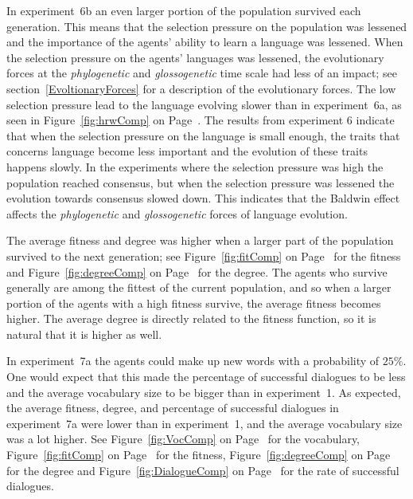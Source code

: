 In experiment~6b an even larger portion of the population survived each generation. This means that the selection pressure on the population was lessened and the importance of the agents' ability to learn a language was lessened. When the selection pressure on the agents' languages was lessened, the evolutionary forces at the \textit{phylogenetic} and \textit{glossogenetic} time scale had less of an impact; see section~\ref{EvoltionaryForces} for a description of the evolutionary forces. The low selection pressure lead to the language evolving slower than in experiment~6a, as seen in Figure~\ref{fig:hrwComp} on Page~\pageref{fig:hrwComp}. The results from experiment 6 indicate that when the selection pressure on the language is small enough, the traits that concerns language become less important and the evolution of these traits happens slowly. In the experiments where the selection pressure was high the population reached consensus, but when the selection pressure was lessened the evolution towards consensus slowed down. This indicates that the Baldwin effect affects the \textit{phylogenetic} and \textit{glossogenetic} forces of language evolution. 

The average fitness and degree was higher when a larger part of the population survived to the next generation; see Figure~\ref{fig:fitComp} on Page~\pageref{fig:fitComp} for the fitness and Figure~\ref{fig:degreeComp} on Page~\pageref{fig:degreeComp} for the degree. The agents who survive generally are among the fittest of the current population, and so when a larger portion of the agents with a high fitness survive, the average fitness becomes higher. The average degree is directly related to the fitness function, so it is natural that it is higher as well.

In experiment~7a the agents could make up new words with a probability of $25\%$. One would expect that this made the percentage of successful dialogues to be less and the average vocabulary size to be bigger than in experiment~1. As expected, the average fitness, degree, and percentage of successful dialogues in experiment~7a were lower than in experiment~1, and the average vocabulary size was a lot higher. See Figure~\ref{fig:VocComp} on Page~\pageref{fig:VocComp} for the vocabulary, Figure~\ref{fig:fitComp} on Page~\pageref{fig:fitComp} for the fitness, Figure~\ref{fig:degreeComp} on Page~\pageref{fig:degreeComp} for the degree and Figure~\ref{fig:DialogueComp} on Page~\pageref{fig:DialogueComp} for the rate of successful dialogues. 

